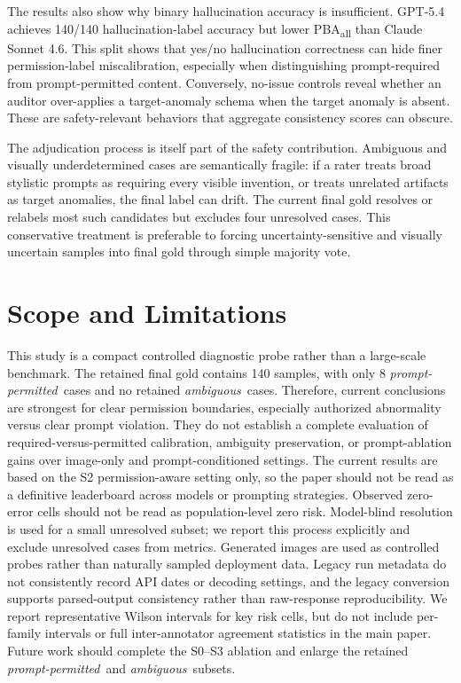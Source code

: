 \documentclass[runningheads]{llncs}
\newcommand{\permpermitted}{\emph{prompt-permitted}}
\newcommand{\permambiguous}{\emph{ambiguous}}
\begin{document}
The results also show why binary hallucination accuracy is insufficient. GPT-5.4 achieves 140/140 hallucination-label accuracy but lower PBA\textsubscript{all} than Claude Sonnet 4.6. This split shows that yes/no hallucination correctness can hide finer permission-label miscalibration, especially when distinguishing prompt-required from prompt-permitted content. Conversely, no-issue controls reveal whether an auditor over-applies a target-anomaly schema when the target anomaly is absent. These are safety-relevant behaviors that aggregate consistency scores can obscure.

The adjudication process is itself part of the safety contribution. Ambiguous and visually underdetermined cases are semantically fragile: if a rater treats broad stylistic prompts as requiring every visible invention, or treats unrelated artifacts as target anomalies, the final label can drift. The current final gold resolves or relabels most such candidates but excludes four unresolved cases. This conservative treatment is preferable to forcing uncertainty-sensitive and visually uncertain samples into final gold through simple majority vote.

\section{Scope and Limitations}

This study is a compact controlled diagnostic probe rather than a large-scale benchmark. The retained final gold contains 140 samples, with only 8 \permpermitted\ cases and no retained \permambiguous\ cases. Therefore, current conclusions are strongest for clear permission boundaries, especially authorized abnormality versus clear prompt violation. They do not establish a complete evaluation of required-versus-permitted calibration, ambiguity preservation, or prompt-ablation gains over image-only and prompt-conditioned settings. The current results are based on the S2 permission-aware setting only, so the paper should not be read as a definitive leaderboard across models or prompting strategies. Observed zero-error cells should not be read as population-level zero risk. Model-blind resolution is used for a small unresolved subset; we report this process explicitly and exclude unresolved cases from metrics. Generated images are used as controlled probes rather than naturally sampled deployment data. Legacy run metadata do not consistently record API dates or decoding settings, and the legacy conversion supports parsed-output consistency rather than raw-response reproducibility. We report representative Wilson intervals for key risk cells, but do not include per-family intervals or full inter-annotator agreement statistics in the main paper. Future work should complete the S0--S3 ablation and enlarge the retained \permpermitted\ and \permambiguous\ subsets.
\end{document}
